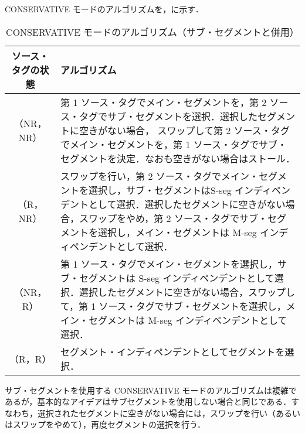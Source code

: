 CONSERVATIVE モードのアルゴリズムを，に示す．
\begin{table}[htb]
  \caption{CONSERVATIVE モードのアルゴリズム（サブ・セグメントと併用）}
  \footnotesize
  \center
   \begin{tabular}{|c|p{13.5cm}|} \hline \hline
    ソース・タグの状態 & アルゴリズム \\ \hline
    （NR，NR） & 第 1 ソース・タグでメイン・セグメントを，第 2 ソース・タグでサブ・セグメントを選択．選択したセグメントに空きがない場合， スワップして第 2 ソース・タグでメイン・セグメントを，第 1 ソース・タグでサブ・セグメントを決定．なおも空きがない場合はストール． \\ \hline
    （R，NR） & スワップを行い，第 2 ソース・タグでメイン・セグメントを選択し，サブ・セグメントはS-seg インディペンデントとして選択．選択したセグメントに空きがない場合，スワップをやめ，第 2 ソース・タグでサブ・セグメントを選択し，メイン・セグメントは M-seg インディペンデントとして選択．\\ \hline
    （NR，R） & 第 1 ソース・タグでメイン・セグメントを選択し，サブ・セグメントは S-seg インディペンデントとして選択．選択したセグメントに空きがない場合，スワップして，第 1 ソース・タグでサブ・セグメントを選択し，メイン・セグメントは M-seg インディペンデントとして選択．\\ \hline
    （R，R） & セグメント・インディペンデントとしてセグメントを選択． \\ \hline
  \end{tabular}
  \label{tab:cons_algorithm_subseg}
\end{table}

サブ・セグメントを使用する CONSERVATIVE モードのアルゴリズムは複雑であるが，基本的なアイデアはサブセグメントを使用しない場合と同じである．すなわち，選択されたセグメントに空きがない場合には，スワップを行い（あるいはスワップをやめて），再度セグメントの選択を行う．

